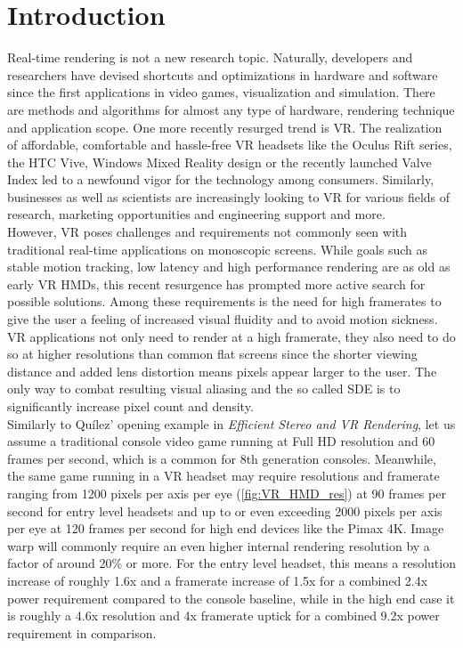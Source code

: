 
\chapter{Introduction}
Real-time rendering is not a new research topic. Naturally,  developers and researchers have devised shortcuts and optimizations in hardware and software since the first applications in video games, visualization and simulation. There are methods and algorithms for almost any type of hardware, rendering technique and application scope. 
One more recently resurged trend is \gls{VR}. The realization of  affordable, comfortable and hassle-free \gls{VR} headsets like the Oculus Rift series, the HTC Vive, Windows Mixed Reality design or the recently launched Valve Index led to a newfound vigor for the technology among consumers. Similarly, businesses as well as scientists are increasingly looking to \gls{VR} for various fields of research, marketing opportunities and engineering support and more. \\
However, \gls{VR} poses challenges and requirements not commonly seen with traditional real-time applications on monoscopic screens.  While goals such as stable motion tracking, low latency and high performance rendering are as old as early \gls{VR} \gls{HMD}s, this recent resurgence has prompted more active search for possible solutions. Among these requirements is the need for high framerates to give the user a feeling of increased visual fluidity and to avoid motion sickness. \gls{VR} applications not only need to render at a high framerate, they also need to do so at higher resolutions than common flat screens since the shorter viewing distance and added lens distortion means pixels appear larger to the user. The only way to combat resulting visual aliasing and the so called \gls{SDE} is to significantly increase pixel count and density. \\

Similarly to Qu\'{i}lez' opening example in \textit{Efficient Stereo and VR Rendering}\cite{InigoQuilez.2017}, let us assume a traditional console video game running at Full HD resolution and 60 frames per second, which is a common for 8th generation consoles. Meanwhile, the same game running in a VR headset may require resolutions and framerate ranging from 1200 pixels per axis per eye (\autoref{fig:VR_HMD_res}) at 90 frames per second for entry level headsets and up to or even exceeding 2000 pixels per axis per eye at 120 frames per second for high end devices like the Pimax 4K. Image warp will commonly require an even higher internal rendering resolution by a factor of around 20\% or more. For the entry level headset, this means a resolution increase of roughly 1.6x and a framerate increase of 1.5x for a combined 2.4x power requirement compared to the console baseline, while in the high end case it is roughly a 4.6x resolution and 4x framerate uptick for a combined 9.2x power requirement in comparison. \\

